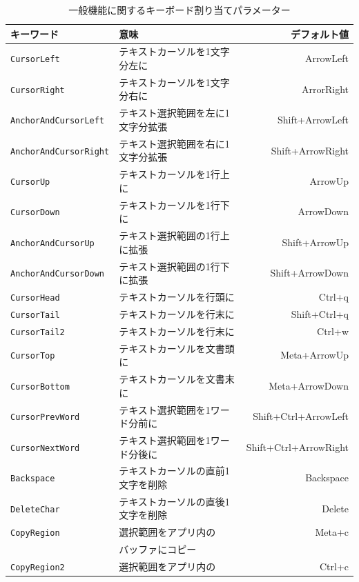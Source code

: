 \begin{table}[h]\label{KeyboardParameters}
	\centering
	\caption{一般機能に関するキーボード割り当てパラメーター}
	\smallskip
	\begin{tabular}{llr}
	\hline
	キーワード & 意味 & デフォルト値\\
	\hline
	\hline
	\texttt{CursorLeft} & テキストカーソルを1文字分左に & ArrowLeft\\
	\hline
	\texttt{CursorRight} & テキストカーソルを1文字分右に & ArrorRight\\
	\hline
	\texttt{AnchorAndCursorLeft} & テキスト選択範囲を左に1文字分拡張 & Shift+ArrowLeft\\
	\hline
	\texttt{AnchorAndCursorRight} & テキスト選択範囲を右に1文字分拡張 & Shift+ArrowRight\\
	\hline
	\texttt{CursorUp} & テキストカーソルを1行上に & ArrowUp\\
	\hline
	\texttt{CursorDown} & テキストカーソルを1行下に & ArrowDown\\
	\hline
	\texttt{AnchorAndCursorUp} & テキスト選択範囲の1行上に拡張 & Shift+ArrowUp\\
	\hline
	\texttt{AnchorAndCursorDown} & テキスト選択範囲の1行下に拡張 & Shift+ArrowDown\\
	\hline
	\texttt{CursorHead} & テキストカーソルを行頭に & Ctrl+q\\
	\hline
	\texttt{CursorTail} & テキストカーソルを行末に & Shift+Ctrl+q\\
	\hline
	\texttt{CursorTail2} & テキストカーソルを行末に & Ctrl+w\\
	\hline
	\texttt{CursorTop} & テキストカーソルを文書頭に & Meta+ArrowUp\\
	\hline
	\texttt{CursorBottom} & テキストカーソルを文書末に & Meta+ArrowDown\\
	\hline
	\texttt{CursorPrevWord} & テキスト選択範囲を1ワード分前に & Shift+Ctrl+ArrowLeft\\
	\hline
	\texttt{CursorNextWord} & テキスト選択範囲を1ワード分後に & Shift+Ctrl+ArrowRight\\
	\hline
	\texttt{Backspace} & テキストカーソルの直前1文字を削除 & Backspace\\
	\hline
	\texttt{DeleteChar} & テキストカーソルの直後1文字を削除 & Delete\\
	\hline
	\texttt{CopyRegion} & 選択範囲をアプリ内の & Meta+c\\
	& バッファにコピー & \\
	\hline
	\texttt{CopyRegion2} & 選択範囲をアプリ内の & Ctrl+c\\

\end{tabular}
\end{table}
